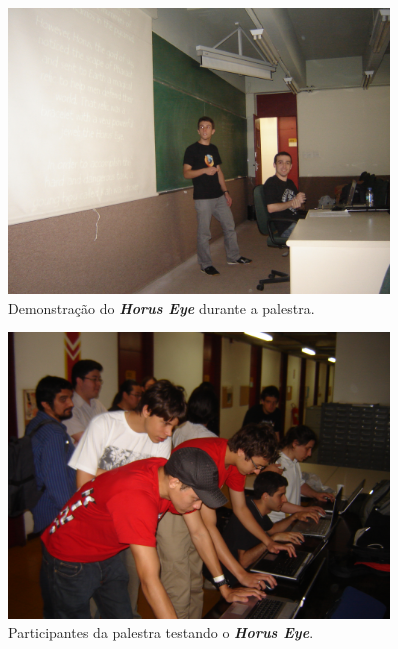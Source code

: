 \documentclass[12pt,onecolumn,a4paper]{article}
\begin{document}
        \begin{figure}[htb]
            \centering
            \includegraphics[width=0.9\textwidth]{images/palestra_02.jpg}
            \caption{Demonstração do \textit{\textbf{Horus Eye}} durante a palestra.}
            \label{fig:palestra_02}
        \end{figure}
        
        \begin{figure}[htb]
            \centering
            \includegraphics[width=0.9\textwidth]{images/palestra_03.jpg}
            \caption{Participantes da palestra testando o \textit{\textbf{Horus Eye}}.}
            \label{fig:palestra_03}
        \end{figure}
        
        
\end{document}
